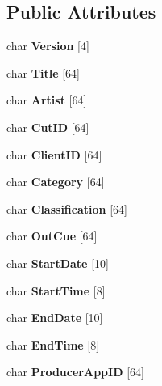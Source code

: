 \subsection*{Public Attributes}
\begin{DoxyCompactItemize}
\item 
char {\bfseries Version} [4]\label{struct_t_a_g___c_a_r_t_abc7f41b25d4cac50ddb2e48866536d2b}

\item 
char {\bfseries Title} [64]\label{struct_t_a_g___c_a_r_t_aaaeb0e4ce9b4989f0b64104e49c5ba18}

\item 
char {\bfseries Artist} [64]\label{struct_t_a_g___c_a_r_t_af508180d2adbdc56c2b39d7b52affa05}

\item 
char {\bfseries Cut\+I\+D} [64]\label{struct_t_a_g___c_a_r_t_aad06bfb61f5147031713db4db192c8db}

\item 
char {\bfseries Client\+I\+D} [64]\label{struct_t_a_g___c_a_r_t_aa59a44212798fcc99e1a48ebc3ce82c7}

\item 
char {\bfseries Category} [64]\label{struct_t_a_g___c_a_r_t_a34408b2034c6df97558db193c5c66a7e}

\item 
char {\bfseries Classification} [64]\label{struct_t_a_g___c_a_r_t_a51d1bd046921cd0a6e8a3d4656ec55ad}

\item 
char {\bfseries Out\+Cue} [64]\label{struct_t_a_g___c_a_r_t_ae3977444c552124b0727b46661151af3}

\item 
char {\bfseries Start\+Date} [10]\label{struct_t_a_g___c_a_r_t_a398f93f20700eff5b0b6b1e1ce47c07b}

\item 
char {\bfseries Start\+Time} [8]\label{struct_t_a_g___c_a_r_t_a41a032ad3086e6aa92ef00d14ba94ca7}

\item 
char {\bfseries End\+Date} [10]\label{struct_t_a_g___c_a_r_t_ac5aa7db0fe719e3f40791df75a4081db}

\item 
char {\bfseries End\+Time} [8]\label{struct_t_a_g___c_a_r_t_ab333ddc91a738a2e0eab9b8cfd05038f}

\item 
char {\bfseries Producer\+App\+I\+D} [64]\label{struct_t_a_g___c_a_r_t_a6d746ca7409403ae18de2adfff7af59e}


\end{DoxyCompactItemize}
